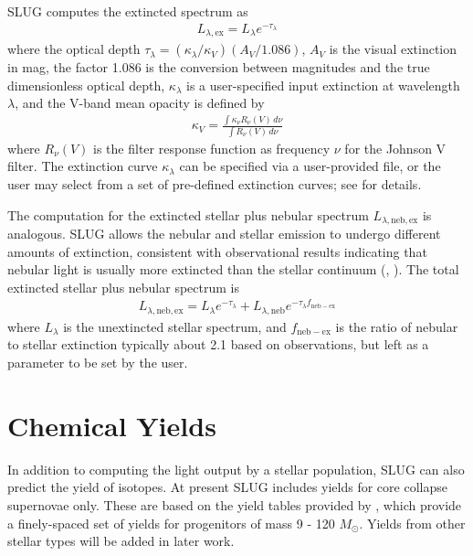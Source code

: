 \documentclass[letterpaper,10pt,english]{sphinxmanual}
\begin{document}
SLUG computes the extincted spectrum as
\begin{equation*}
\begin{split}L_{\lambda,\mathrm{ex}} = L_{\lambda} e^{-\tau_\lambda}\end{split}
\end{equation*}
where the optical depth \(\tau_\lambda = (\kappa_\lambda / \kappa_V) (A_V/1.086)\), \(A_V\) is the visual extinction in mag, the factor 1.086 is the conversion between magnitudes and the true dimensionless optical depth, \(\kappa_\lambda\) is a user-specified input extinction at wavelength \(\lambda\), and the V-band mean opacity is defined by
\begin{equation*}
\begin{split}\kappa_V = \frac{\int \kappa_\nu R_\nu(V) \, d\nu}{\int R_\nu(V) \, d\nu}\end{split}
\end{equation*}
where \(R_\nu(V)\) is the filter response function as frequency \(\nu\) for the Johnson V filter. The extinction curve \(\kappa_\lambda\) can be specified via a user-provided file, or the user may select from a set of pre-defined extinction curves; see {\hyperref[\detokenize{parameters:ssec-extinction-keywords}]{}} for details.

The computation for the extincted stellar plus nebular spectrum \(L_{\lambda,\mathrm{neb,ex}}\) is analogous. SLUG allows the nebular and stellar emission to undergo different amounts of extinction, consistent with observational results indicating that nebular light is usually more extincted than the stellar continuum (, ). The total extincted stellar plus nebular spectrum is
\begin{equation*}
\begin{split}L_{\lambda,\mathrm{neb,ex}} = L_{\lambda} e^{-\tau_\lambda} + L_{\lambda,\mathrm{neb}} e^{-\tau_\lambda f_{\mathrm{neb-ex}}}\end{split}
\end{equation*}
where \(L_{\lambda}\) is the unextincted stellar spectrum, and \(f_{\mathrm{neb-ex}}\) is the ratio of nebular to stellar extinction \textendash{} typically about 2.1 based on observations, but left as a parameter to be set by the user.


\section{Chemical Yields}
\label{\detokenize{intro:chemical-yields}}\label{\detokenize{intro:ssec-yields}}
In addition to computing the light output by a stellar population, SLUG can also predict the yield of isotopes. At present SLUG includes yields for core collapse supernovae only. These are based on the yield tables provided by , which provide a finely-spaced set of yields for progenitors of mass 9 - 120 \(M_\odot\). Yields from other stellar types will be added in later work.
\end{document}
